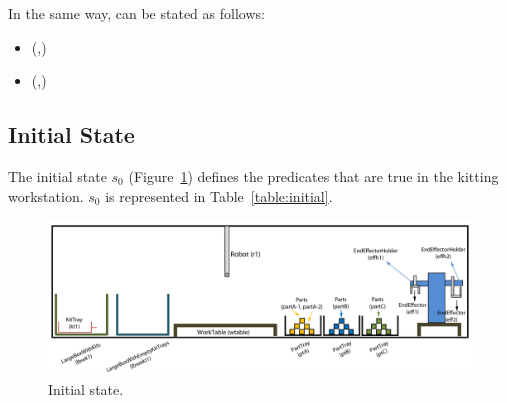 In the same way,  can be stated as follows:
\begin{itemize}
 \item {}(,)
 \item {}(,)
\end{itemize}

\subsection{Initial State}
The initial state $s_0$ (Figure~\ref{fig:s0}) defines the predicates that are true in the kitting workstation. $s_0$ is represented in Table~\ref{table:initial}.

\begin{figure}[h!t!]
\centering
\includegraphics[width=16cm]{Figure/s0.jpg}
\caption{Initial state.}
\label{fig:s0}
\end{figure}


